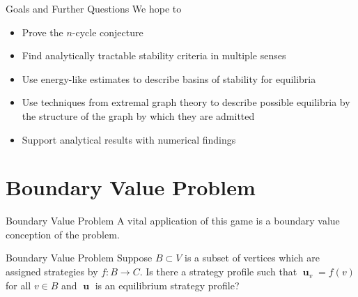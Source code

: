 \documentclass{beamer}
\DeclareMathOperator{\uu}{\mathbf{u}}
\begin{document}
\begin{frame}{Goals and Further Questions}
	We hope to 
	\begin{itemize}
		\item Prove the $n$-cycle conjecture
		\item Find analytically tractable stability criteria in multiple senses
		\item Use energy-like estimates to describe basins of stability for equilibria
		\item Use techniques from extremal graph theory to describe possible equilibria by the structure of the graph by which they are admitted
		\item Support analytical results with numerical findings 
	\end{itemize}
\end{frame}


\section{Boundary Value Problem}
\begin{frame}{Boundary Value Problem}
	A vital application of this game is a boundary value conception of the problem.
	\begin{block}{Boundary Value Problem}
		Suppose $B\subset V$ is a subset of vertices which are assigned strategies by $f:B\rightarrow C$. Is there a strategy profile such that $\uu_v=f(v)$ for all $v\in B$ and $\uu$ is an equilibrium strategy profile?
	\end{block}
\end{frame}
\end{document}
